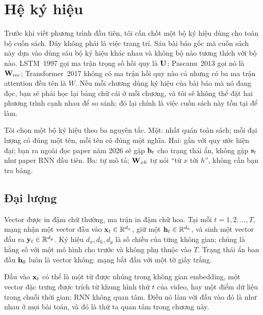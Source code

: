 %

\section{Hệ ký hiệu}
\label{sec:ch01-ky-hieu}

Trước khi viết phương trình đầu tiên, tôi cần chốt một bộ ký hiệu dùng cho
toàn bộ cuốn sách. Đây không phải là việc trang trí. Sáu bài báo gốc mà cuốn
sách này dựa vào dùng sáu bộ ký hiệu khác nhau và không bộ nào tương thích
với bộ nào. LSTM~1997 gọi ma trận trọng số hồi quy là $\mathbf{U}$; Pascanu~2013
gọi nó là $\mathbf{W}_{\text{rec}}$; Transformer~2017 không có ma trận hồi quy
nào cả nhưng có ba ma trận attention đều tên là $W$. Nếu mỗi chương dùng ký
hiệu của bài báo mà nó đang đọc, bạn sẽ phải học lại bảng chữ cái ở mỗi
chương, và tôi sẽ không thể đặt hai phương trình cạnh nhau để so sánh; đó
lại chính là việc cuốn sách này tồn tại để làm.

Tôi chọn một bộ ký hiệu theo ba nguyên tắc. Một: nhất quán toàn sách; mỗi
đại lượng có đúng một tên, mỗi tên có đúng một nghĩa. Hai: gần với quy ước
hiện đại; bạn ra ngoài đọc paper năm 2026 sẽ gặp $\mathbf{h}_t$ cho trạng thái
ẩn, không gặp $\mathbf{s}_t$ như paper RNN đầu tiên. Ba: tự mô tả; $\mathbf{W}_{xh}$
tự nói ``từ $x$ tới $h$'', không cần bạn tra bảng.

\subsection{Đại lượng}

Vector được in đậm chữ thường, ma trận in đậm chữ hoa. Tại mỗi
 $t = 1, 2, \dots, T$, mạng nhận một vector đầu
vào $\mathbf{x}_t \in \mathbb{R}^{d_x}$, giữ một 
$\mathbf{h}_t \in \mathbb{R}^{d_h}$,
và sinh một vector đầu ra $\mathbf{y}_t \in \mathbb{R}^{d_y}$. Ký hiệu $d_x, d_h, d_y$
là số chiều của từng không gian; chúng là hằng số với một mô hình cho trước
và không phụ thuộc vào $T$. Trạng thái ẩn ban đầu $\mathbf{h}_0$ luôn là vector
không: mạng bắt đầu với một tờ giấy trắng.

Đầu vào $\mathbf{x}_t$ có thể là một từ được nhúng trong không gian
embedding, một vector đặc trưng được trích từ khung hình thứ $t$ của video,
hay một điểm dữ liệu trong chuỗi thời gian; RNN không quan tâm. Điều nó
làm với đầu vào đó là như nhau ở mọi bài toán, và đó là thứ ta quan tâm
trong chương này.

